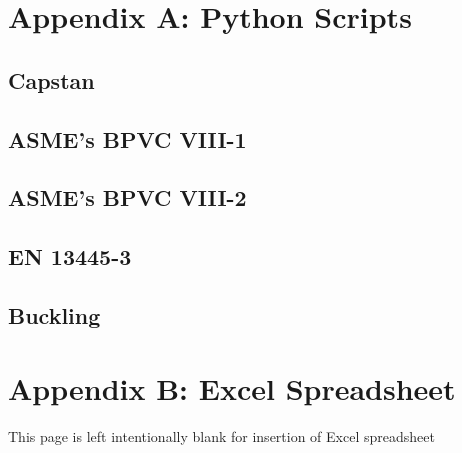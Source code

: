 \renewcommand{\thesection}{A.\arabic{section}}
\chapter{Appendix A: Python Scripts}
\label{appendix:a}
\nopagebreak
\begin{small}
	
	\section{Capstan}
	\label{appendix:a0}
		
	
	\section{ASME's BPVC VIII-1}
	\label{appendix:a1}
	
	
	\section{ASME's BPVC VIII-2}
	\label{appendix:a2}
	
	
	\section{EN 13445-3}
	\label{appendix:a3}
	
	
	\section{Buckling}
	\label{appendix:a4}
	

\end{small}

\renewcommand{\thesection}{B.\arabic{section}}
\chapter{Appendix B: Excel Spreadsheet}
\label{appendix:b}

\vfill
\begin{center}
This page is left intentionally blank for insertion of Excel spreadsheet
\end{center}
\vfill


